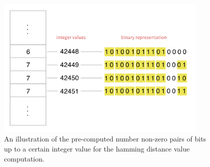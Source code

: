 \begin{figure}[h]
	\centering
	\includegraphics[width=4.0in]{contents/00_images/pre-computed-hd-values}\vspace*{5pt}
	
	\caption{An illustration of the pre-computed number non-zero pairs of bits up to a certain integer value for the hamming distance value computation.}
	\label{fig:pre-computed-hd}
\end{figure}